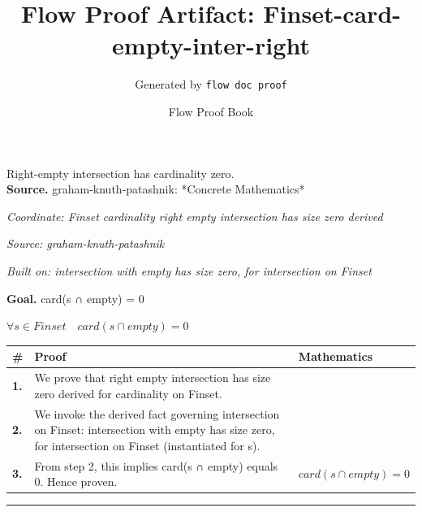 \documentclass[11pt]{article}
\title{Flow Proof Artifact: Finset-card-empty-inter-right}
\author{Generated by \texttt{flow doc proof}}
\date{Flow Proof Book}
\theoremstyle{definition}
\begin{document}
\maketitle
Right-empty intersection has cardinality zero.\\[0.5em]
\textbf{Source.} graham-knuth-patashnik: *Concrete Mathematics*\\[0.5em]
\bigskip
{}\par
\smallskip\noindent\textit{Coordinate: Finset \cdot cardinality \cdot right empty intersection has size zero derived}\par
\smallskip\noindent\textit{Source: graham-knuth-patashnik}\par
\smallskip\noindent\textit{Built on: intersection with empty has size zero, for intersection on Finset}\par
\medskip
\noindent\textbf{Goal.} card(s ∩ empty) = 0\par
\noindent$\displaystyle \forall s \in Finset\quad card(s ∩ empty) = 0$\par
\medskip
\noindent
\begin{tabular}{@{} >{\raggedright\arraybackslash}p{} >{\raggedright\arraybackslash}p{} >{\raggedleft\arraybackslash}p{} @{}}
\textbf{\#} & \textbf{Proof} & \textbf{Mathematics} \\
\midrule
\textbf{1.} & We prove that right empty intersection has size zero derived for cardinality on Finset. & \\[0.45em]
\textbf{2.} & We invoke the derived fact governing intersection on Finset: intersection with empty has size zero, for intersection on Finset (instantiated for s). & \\[0.45em]
\textbf{3.} & From step 2, this implies card(s ∩ empty) equals 0. Hence proven. & $\displaystyle card(s ∩ empty) = 0$ \\[0.45em]
\bottomrule
\end{tabular}
\label{thm:Finset-cardinality-right_empty_intersection_has_size_zero_derived}
\par\medskip\hrule
\end{document}
